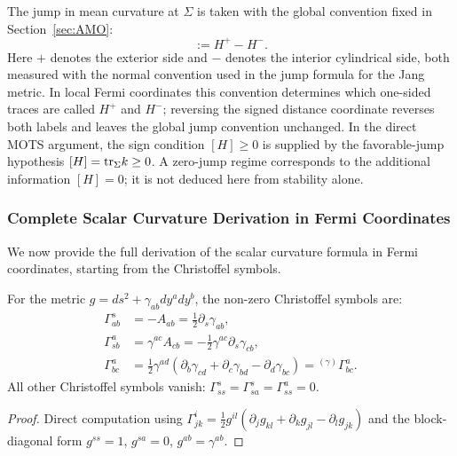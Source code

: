 \begin{corollary}
\label{cor:MeanCurvJump}
The jump in mean curvature at $\Sigma$ is taken with the global convention fixed in Section~\ref{sec:AMO}:
\begin{equation}
[H] := H^+ - H^- .
\end{equation}
Here \(+\) denotes the exterior side and \(-\) denotes the interior cylindrical side, both measured with the normal convention used in the jump formula for the Jang metric. In local Fermi coordinates this convention determines which one-sided traces are called \(H^+\) and \(H^-\); reversing the signed distance coordinate reverses both labels and leaves the global jump convention unchanged.
In the direct MOTS argument, the sign condition $[H] \ge 0$ is supplied by the favorable-jump hypothesis $[H]=\mathrm{tr}_\Sigma k \ge 0$. A zero-jump regime corresponds to the additional information $[H]=0$; it is not deduced here from stability alone.
\end{corollary}

\subsubsection{Complete Scalar Curvature Derivation in Fermi Coordinates}

We now provide the full derivation of the scalar curvature formula in Fermi coordinates, starting from the Christoffel symbols.

\begin{lemma}
\label{lem:ChristoffelFermi}
For the metric $g = ds^2 + \gamma_{ab} dy^a dy^b$, the non-zero Christoffel symbols are:
\begin{align}
\Gamma^s_{ab} &= -A_{ab} = \frac{1}{2} \partial_s \gamma_{ab}, \label{eq:Gamma1}\\
\Gamma^a_{sb} &= \gamma^{ac} A_{cb} = -\frac{1}{2} \gamma^{ac} \partial_s \gamma_{cb}, \label{eq:Gamma2}\\
\Gamma^a_{bc} &= \frac{1}{2} \gamma^{ad} \left( \partial_b \gamma_{cd} + \partial_c \gamma_{bd} - \partial_d \gamma_{bc} \right) = {}^{(\gamma)}\Gamma^a_{bc}. \label{eq:Gamma3}
\end{align}
All other Christoffel symbols vanish: $\Gamma^s_{ss} = \Gamma^s_{sa} = \Gamma^a_{ss} = 0$.
\end{lemma}

\begin{proof}
Direct computation using $\Gamma^i_{jk} = \frac{1}{2} g^{il}(\partial_j g_{kl} + \partial_k g_{jl} - \partial_l g_{jk})$ and the block-diagonal form $g^{ss} = 1$, $g^{sa} = 0$, $g^{ab} = \gamma^{ab}$.
\end{proof}

